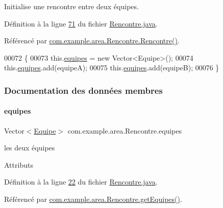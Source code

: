 Initialise une rencontre entre deux équipes. 



Définition à la ligne \hyperlink{_rencontre_8java_source_l00071}{71} du fichier \hyperlink{_rencontre_8java_source}{Rencontre.\+java}.



Référencé par \hyperlink{_rencontre_8java_source_l00041}{com.\+example.\+area.\+Rencontre.\+Rencontre()}.


\begin{DoxyCode}
00072     \{
00073         this.\hyperlink{classcom_1_1example_1_1area_1_1_rencontre_accbafe5a878f457fb7119cfd55401c86}{equipes} = \textcolor{keyword}{new} Vector<Equipe>();
00074         this.\hyperlink{classcom_1_1example_1_1area_1_1_rencontre_accbafe5a878f457fb7119cfd55401c86}{equipes}.add(equipeA);
00075         this.\hyperlink{classcom_1_1example_1_1area_1_1_rencontre_accbafe5a878f457fb7119cfd55401c86}{equipes}.add(equipeB);
00076     \}
\end{DoxyCode}


\subsubsection{Documentation des données membres}
\mbox{\label{classcom_1_1example_1_1area_1_1_rencontre_accbafe5a878f457fb7119cfd55401c86}} 
\paragraph{\texorpdfstring{equipes}{equipes}}
{\footnotesize\ttfamily Vector$<$\hyperlink{classcom_1_1example_1_1area_1_1_equipe}{Equipe}$>$ com.\+example.\+area.\+Rencontre.\+equipes\hspace{0.3cm}{\ttfamily [private]}}



les deux équipes 

Attributs 

Définition à la ligne \hyperlink{_rencontre_8java_source_l00022}{22} du fichier \hyperlink{_rencontre_8java_source}{Rencontre.\+java}.



Référencé par \hyperlink{_rencontre_8java_source_l00149}{com.\+example.\+area.\+Rencontre.\+get\+Equipes()}.

